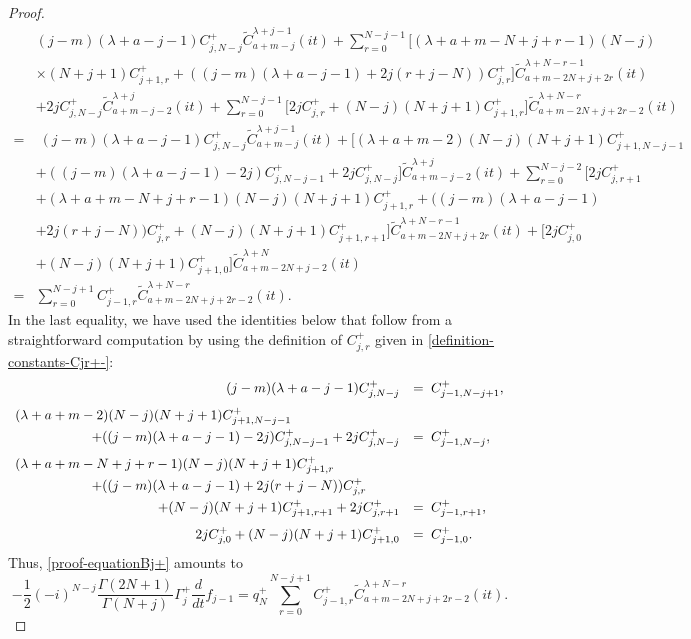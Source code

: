\documentclass[12pt, pdflatex, a4paper]{article}
\theoremstyle{plain}
\theoremstyle{definition}
\def\Geg{\widetilde{C}}
\begin{document}
\begin{proof}
\begin{align*}
&(j-m)(\lambda + a-j-1)C_{j,N-j}^+\Geg_{a+m-j}^{\lambda+j-1}(it) + \sum_{r=0}^{N-j-1}\Big[(\lambda+a+m-N+j+r-1)(N-j) \\
&\times(N+j+1)C_{j+1,r}^+ + ((j-m)(\lambda + a-j-1)+2j(r+j-N))C_{j,r}^+\Big]\Geg_{a+m-2N+j+2r}^{\lambda+N-r-1}(it)\\
& + 2jC_{j, N-j}^+\Geg_{a+m-j-2}^{\lambda+j}(it)
+\sum_{r=0}^{N-j-1}\Big[2jC_{j, r}^+
+(N-j)(N+j+1)C_{j+1, r}^+\Big]\Geg_{a+m-2N+j+2r-2}^{\lambda+N-r}(it)\\	
=& \; (j-m)(\lambda + a-j-1)C_{j,N-j}^+\Geg_{a+m-j}^{\lambda+j-1}(it) + \Big[(\lambda+a+m-2)(N-j)(N+j+1)C_{j+1, N-j-1}^+\\
& + ((j-m)(\lambda+a-j-1)-2j)C_{j, N-j-1}^+ + 2jC_{j, N-j}^+\Big]\Geg_{a+m-j-2}^{\lambda+j}(it) + \sum_{r=0}^{N-j-2}\Big[2jC_{j, r+1}^+\\
& +(\lambda+a+m-N+j+r-1)(N-j)(N+j+1)C_{j+1, r}^+ + ((j-m)(\lambda+a-j-1)\\
& +2j(r+j-N))C_{j,r}^+ + (N-j)(N+j+1)C_{j+1, r+1}^+\Big]\Geg_{a+m-2N+j+2r}^{\lambda+N-r-1}(it) + \Big[2jC_{j, 0}^+\\& + (N-j)(N+j+1)C_{j+1, 0}^+\Big]\Geg_{a+m-2N+j-2}^{\lambda+N}(it)\\
= &\sum_{r=0}^{N-j+1}C_{j-1, r}^+\Geg_{a+m-2N+j+2r-2}^{\lambda+N-r}(it).
\end{align*}
In the last equality, we have used the identities below that follow from a straightforward computation by using the definition of $C_{j,r}^+$ given in \eqref{definition-constants-Cjr+-}:
\begin{equation*}
\begin{array}{l l}
\hfill (j-m)(\lambda + a-j-1)C_{j,N-j}^+ & = \; C_{j-1, N-j+1}^+,\\[8pt]
(\lambda+a+m-2)(N-j)(N+j+1)C_{j+1, N-j-1}^+ &\\[4pt]
\hspace{2cm} +((j-m)(\lambda+a-j-1)-2j)C_{j, N-j-1}^+ + 2jC_{j, N-j}^+ & = \; C_{j-1, N-j}^+,\\[8pt]
(\lambda+a+m-N+j+r-1)(N-j)(N+j+1)C_{j+1, r}^+ &\\[4pt]
\hspace{2cm} + ((j-m)(\lambda+a-j-1) +2j(r+j-N))C_{j,r}^+ &\\[4pt]
\hfill + (N-j)(N+j+1)C_{j+1, r+1}^+ +2jC_{j, r+1}^+ & = \; C_{j-1, r+1}^+,\\[8pt]
\hfill 2jC_{j, 0}^++ (N-j)(N+j+1)C_{j+1, 0}^+ & = \; C_{j-1, 0}^+.
\end{array}
\end{equation*}
Thus, \eqref{proof-equationBj+} amounts to
\begin{equation*}
-\frac{1}{2}(-i)^{N-j}\frac{\Gamma(2N+1)}{\Gamma(N+j)}\Gamma_{j}^+\frac{d}{dt}f_{j-1} = q_N^+\sum_{r=0}^{N-j+1}C_{j-1, r}^+\Geg_{a+m-2N+j+2r-2}^{\lambda+N-r}(it).
\end{equation*}


\end{proof}
\end{document}
